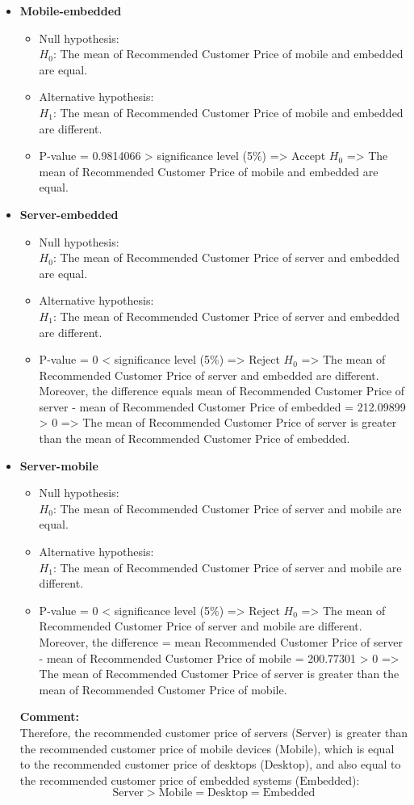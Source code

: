 \documentclass[a4paper]{article}
\begin{document}
\begin{itemize}
		\item \textbf{Mobile-embedded}
		\begin{itemize}
			\item Null hypothesis:\\
			\(H_0\): The mean of Recommended Customer Price of mobile and embedded are equal.
			\item Alternative hypothesis:\\
			\(H_1\): The mean of Recommended Customer Price of mobile and embedded are different.
			\item P-value = 0.9814066 > significance level (5\%) => Accept \(H_0\) => The mean of Recommended Customer Price of mobile and embedded are equal.
		\end{itemize}
		
		\item \textbf{Server-embedded}
		\begin{itemize}
			\item Null hypothesis:\\
			\(H_0\): The mean of Recommended Customer Price of server and embedded are equal.
			\item Alternative hypothesis:\\
			\(H_1\): The mean of Recommended Customer Price of server and embedded are different.
			\item P-value = 0 < significance level (5\%) => Reject \(H_0\) => The mean of Recommended Customer Price of server and embedded are different. Moreover, the difference equals mean of Recommended Customer Price of server - mean of Recommended Customer Price of embedded = 212.09899 > 0 => The mean of Recommended Customer Price of server is greater than the mean of Recommended Customer Price of embedded.
		\end{itemize}
		\item \textbf{Server-mobile}
		\begin{itemize}
			\item Null hypothesis:\\
			\(H_0\): The mean of Recommended Customer Price of server and mobile are equal.
			\item Alternative hypothesis:\\
			\(H_1\): The mean of Recommended Customer Price of server and mobile are different.
			\item P-value = 0 < significance level (5\%) => Reject \(H_0\) => The mean of Recommended Customer Price of server and mobile are different. Moreover, the difference = mean Recommended Customer Price of server - mean of Recommended Customer Price of mobile = 200.77301 > 0 => The mean of Recommended Customer Price of server is greater than the mean of Recommended Customer Price of mobile.
		\end{itemize}
		\textbf{Comment:}
		\\
		Therefore, the recommended customer price of servers ($\text{Server}$) is greater than the recommended customer price of mobile devices ($\text{Mobile}$), which is equal to the recommended customer price of desktops ($\text{Desktop}$), and also equal to the recommended customer price of embedded systems ($\text{Embedded}$):
		\[
		\text{Server} > \text{Mobile} = \text{Desktop} = \text{Embedded}
		\]

\end{itemize}
\end{document}
